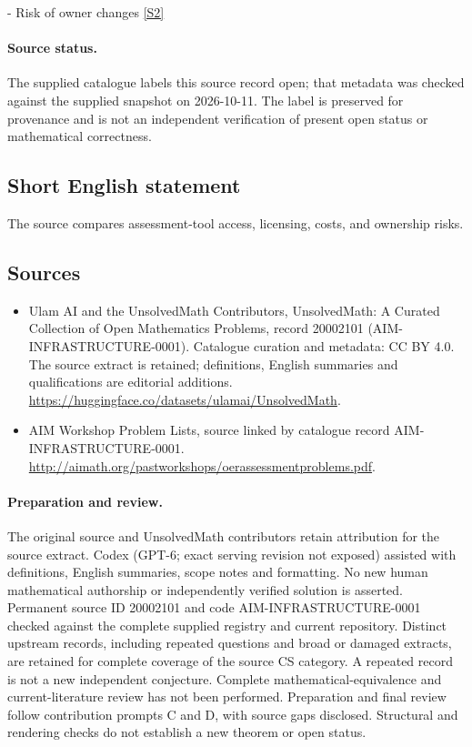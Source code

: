 \documentclass[11pt]{article}
\newcommand{\sref}[2]{\hyperlink{source:#1:#2}{[S#2]}}
\begin{document}
- Risk of owner changes \sref{20002101}{2}
\paragraph{Source status.}
The supplied catalogue labels this source record open; that metadata was checked against the supplied snapshot on 2026-10-11. The label is preserved for provenance and is not an independent verification of present open status or mathematical correctness.
\subsection{Short English statement}
The source compares assessment-tool access, licensing, costs, and ownership risks.
\subsection{Sources}
\begin{itemize}
\item[\hypertarget{source:20002101:1}{S1}] Ulam AI and the UnsolvedMath Contributors, UnsolvedMath: A Curated Collection of Open Mathematics Problems, record 20002101 (AIM-INFRASTRUCTURE-0001). Catalogue curation and metadata: CC BY 4.0. The source extract is retained; definitions, English summaries and qualifications are editorial additions.
\url{https://huggingface.co/datasets/ulamai/UnsolvedMath}.
\item[\hypertarget{source:20002101:2}{S2}] AIM Workshop Problem Lists, source linked by catalogue record AIM-INFRASTRUCTURE-0001.
\url{http://aimath.org/pastworkshops/oerassessmentproblems.pdf}.
\end{itemize}
\paragraph{Preparation and review.}
The original source and UnsolvedMath contributors retain attribution for the source extract. Codex (GPT-6; exact serving revision not exposed) assisted with definitions, English summaries, scope notes and formatting. No new human mathematical authorship or independently verified solution is asserted. Permanent source ID 20002101 and code AIM-INFRASTRUCTURE-0001 checked against the complete supplied registry and current repository. Distinct upstream records, including repeated questions and broad or damaged extracts, are retained for complete coverage of the source CS category. A repeated record is not a new independent conjecture. Complete mathematical-equivalence and current-literature review has not been performed. Preparation and final review follow contribution prompts C and D, with source gaps disclosed. Structural and rendering checks do not establish a new theorem or open status.
\label{end:20002101}
\end{document}
